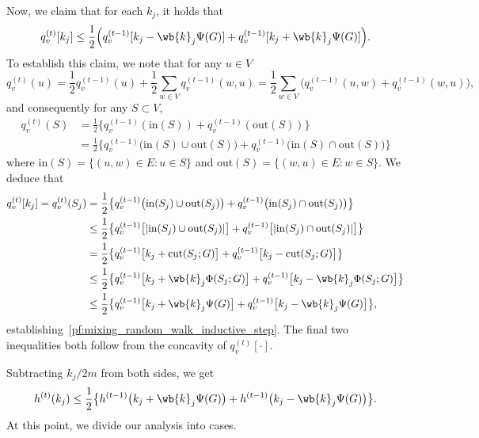 \documentclass[twoside,11pt]{article}
\newcommand{\1}{\mathbf{1}}
\begin{document}
Now, we claim that for each $k_j$, it holds that
\begin{equation}
\label{pf:mixing_random_walk_inductive_step}
q_v^{(t)}[k_j] \leq \frac{1}{2}\Bigl(q_v^{(t - 1)}[k_j - \wb{k}_j \Psi(G)] + q_v^{(t - 1)}[k_j + \wb{k}_j \Psi(G)]\Bigr).
\end{equation}
To establish this claim, we note that for any $u \in V$
\begin{equation*}
q_v^{(t)}(u) = \frac{1}{2}q_v^{(t - 1)}(u) + \frac{1}{2}\sum_{w \in V}q_v^{(t - 1)}(w,u) = \frac{1}{2} \sum_{w \in V} \bigl(q_v^{(t - 1)}(u,w) + q_v^{(t - 1)}(w,u)\bigr),
\end{equation*}
and consequently for any $S \subset V$,
\begin{align*}
q_v^{(t)}(S) & = \frac{1}{2}\bigl\{q_v^{(t - 1)}(\mathrm{in}(S)) +  q_v^{(t - 1)}(\mathrm{out}(S))\bigr\} \\
& = \frac{1}{2}\bigl\{q_v^{(t - 1)}\bigl(\mathrm{in}(S) \cup \mathrm{out}(S)\bigr) +  q_v^{(t - 1)}\bigl(\mathrm{in}(S) \cap \mathrm{out}(S)\bigr)\bigr\}
\end{align*}
where $\mathrm{in}(S) = \{(u,w) \in E: u \in S\}$ and $\mathrm{out}(S) = \{(w,u) \in E: w \in S\}$. We deduce that
\begin{align*}
q_v^{(t)}[k_j] = q_v^{(t)}(S_j) & = \frac{1}{2}\bigl\{q_v^{(t - 1)}\bigl(\mathrm{in}(S_j) \cup \mathrm{out}(S_j)\bigr) +  q_v^{(t - 1)}\bigl(\mathrm{in}(S_j) \cap \mathrm{out}(S_j)\bigr)\bigr\} \\
& \leq \frac{1}{2}\bigl\{q_v^{(t - 1)}\bigl[|\mathrm{in}(S_j) \cup \mathrm{out}(S_j)|\bigr] +  q_v^{(t - 1)}\bigl[|\mathrm{in}(S_j) \cap \mathrm{out}(S_j)|\bigr]\bigr\} \\
& = \frac{1}{2}\bigl\{q_v^{(t - 1)}\bigl[k_j + \mathrm{cut}(S_j;G)\bigr] +  q_v^{(t - 1)}\bigl[k_j - \mathrm{cut}(S_j;G)\bigr]\bigr\} \\
& \leq \frac{1}{2}\bigl\{q_v^{(t - 1)}\bigl[k_j + \wb{k}_j\Phi(S_j;G)\bigr] +  q_v^{(t - 1)}\bigl[k_j - \wb{k}_j\Phi(S_j;G)\bigr]\bigr\} \\
& \leq \frac{1}{2}\bigl\{q_v^{(t - 1)}\bigl[k_j + \wb{k}_j\Psi(G)\bigr] +  q_v^{(t - 1)}\bigl[k_j - \wb{k}_j\Psi(G)\bigr]\bigr\},
\end{align*}
establishing~\eqref{pf:mixing_random_walk_inductive_step}. The final two inequalities both follow from the concavity of $q_v^{(t)}[\cdot]$. 

Subtracting $k_j/2m$ from both sides, we get
\begin{equation}
\label{pf:mixing_random_walk_inductive_step_h}
h^{(t)}(k_j) \leq \frac{1}{2}\bigl\{h^{(t - 1)}\bigl(k_j + \wb{k}_j\Psi(G)\bigr)+  h^{(t - 1)}\bigl(k_j - \wb{k}_j\Psi(G)\bigr)\bigr\}.
\end{equation}
At this point, we divide our analysis into cases.
\end{document}
